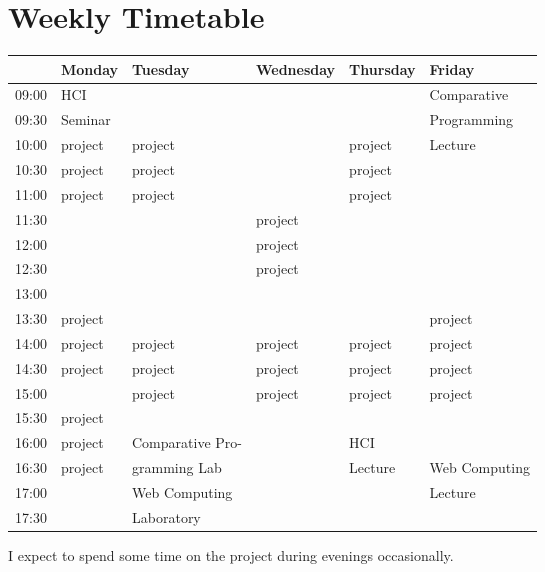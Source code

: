 \documentclass{article}
\begin{document}
\section{Weekly Timetable}
\hspace*{-3cm}
\begin{tabularx}{1.5\textwidth}{|c|X|X|X|X|X|}
\hline  
& Monday & Tuesday & Wednesday & Thursday & Friday \\ \hline
09:00 & HCI & & & & Comparative \\ \cline{3-5} \cline{1-1}
09:30 & Seminar & & & & Programming \\ \cline{1-5}
10:00 & project & project & & project & Lecture \\ \cline{1-5}
10:30 & project & project & & project & \\ \hline
11:00 & project & project & & project & \\ \hline
11:30 & & & project & & \\ \hline
12:00 & & & project & & \\ \hline
12:30 & & & project & & \\ \hline
13:00 & & & & & \\ \hline
13:30 & project & & & & project \\ \hline
14:00 & project & project & project & project & project \\ \hline
14:30 & project & project & project & project & project \\ \hline
15:00 & & project & project & project & project \\ \hline
15:30 & project & & & & \\ \hline
16:00 & project & Comparative Pro- & & HCI & \\ \cline{1-2} \cline{4-4}
16:30 & project & gramming Lab & & Lecture & Web Computing \\ \cline{1-5}
17:00 & & Web Computing & & & Lecture \\ \cline{1-2} \cline{4-5}
17:30 & & Laboratory& & & \\ \hline
\end{tabularx} 
\hspace*{-3cm}

I expect to spend some time on the project during evenings occasionally.
\end{document}
